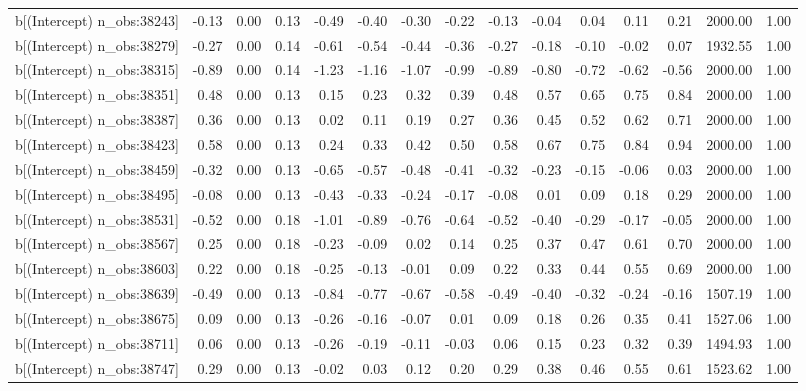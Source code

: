 \begin{table}[ht]
\begin{tabular}{rrrrrrrrrrrrrrr}
  b[(Intercept) n\_obs:38243] & -0.13 & 0.00 & 0.13 & -0.49 & -0.40 & -0.30 & -0.22 & -0.13 & -0.04 & 0.04 & 0.11 & 0.21 & 2000.00 & 1.00 \\ 
  b[(Intercept) n\_obs:38279] & -0.27 & 0.00 & 0.14 & -0.61 & -0.54 & -0.44 & -0.36 & -0.27 & -0.18 & -0.10 & -0.02 & 0.07 & 1932.55 & 1.00 \\ 
  b[(Intercept) n\_obs:38315] & -0.89 & 0.00 & 0.14 & -1.23 & -1.16 & -1.07 & -0.99 & -0.89 & -0.80 & -0.72 & -0.62 & -0.56 & 2000.00 & 1.00 \\ 
  b[(Intercept) n\_obs:38351] & 0.48 & 0.00 & 0.13 & 0.15 & 0.23 & 0.32 & 0.39 & 0.48 & 0.57 & 0.65 & 0.75 & 0.84 & 2000.00 & 1.00 \\ 
  b[(Intercept) n\_obs:38387] & 0.36 & 0.00 & 0.13 & 0.02 & 0.11 & 0.19 & 0.27 & 0.36 & 0.45 & 0.52 & 0.62 & 0.71 & 2000.00 & 1.00 \\ 
  b[(Intercept) n\_obs:38423] & 0.58 & 0.00 & 0.13 & 0.24 & 0.33 & 0.42 & 0.50 & 0.58 & 0.67 & 0.75 & 0.84 & 0.94 & 2000.00 & 1.00 \\ 
  b[(Intercept) n\_obs:38459] & -0.32 & 0.00 & 0.13 & -0.65 & -0.57 & -0.48 & -0.41 & -0.32 & -0.23 & -0.15 & -0.06 & 0.03 & 2000.00 & 1.00 \\ 
  b[(Intercept) n\_obs:38495] & -0.08 & 0.00 & 0.13 & -0.43 & -0.33 & -0.24 & -0.17 & -0.08 & 0.01 & 0.09 & 0.18 & 0.29 & 2000.00 & 1.00 \\ 
  b[(Intercept) n\_obs:38531] & -0.52 & 0.00 & 0.18 & -1.01 & -0.89 & -0.76 & -0.64 & -0.52 & -0.40 & -0.29 & -0.17 & -0.05 & 2000.00 & 1.00 \\ 
  b[(Intercept) n\_obs:38567] & 0.25 & 0.00 & 0.18 & -0.23 & -0.09 & 0.02 & 0.14 & 0.25 & 0.37 & 0.47 & 0.61 & 0.70 & 2000.00 & 1.00 \\ 
  b[(Intercept) n\_obs:38603] & 0.22 & 0.00 & 0.18 & -0.25 & -0.13 & -0.01 & 0.09 & 0.22 & 0.33 & 0.44 & 0.55 & 0.69 & 2000.00 & 1.00 \\ 
  b[(Intercept) n\_obs:38639] & -0.49 & 0.00 & 0.13 & -0.84 & -0.77 & -0.67 & -0.58 & -0.49 & -0.40 & -0.32 & -0.24 & -0.16 & 1507.19 & 1.00 \\ 
  b[(Intercept) n\_obs:38675] & 0.09 & 0.00 & 0.13 & -0.26 & -0.16 & -0.07 & 0.01 & 0.09 & 0.18 & 0.26 & 0.35 & 0.41 & 1527.06 & 1.00 \\ 
  b[(Intercept) n\_obs:38711] & 0.06 & 0.00 & 0.13 & -0.26 & -0.19 & -0.11 & -0.03 & 0.06 & 0.15 & 0.23 & 0.32 & 0.39 & 1494.93 & 1.00 \\ 
  b[(Intercept) n\_obs:38747] & 0.29 & 0.00 & 0.13 & -0.02 & 0.03 & 0.12 & 0.20 & 0.29 & 0.38 & 0.46 & 0.55 & 0.61 & 1523.62 & 1.00 \\ 

\end{tabular}
\end{table}
